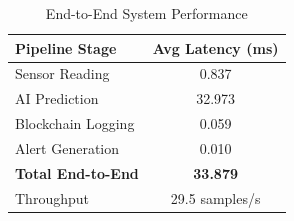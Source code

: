 \begin{table}[h]
\centering
\caption{End-to-End System Performance}
\begin{tabular}{lc}
\hline
Pipeline Stage & Avg Latency (ms) \\
\hline
Sensor Reading & 0.837 \\
AI Prediction & 32.973 \\
Blockchain Logging & 0.059 \\
Alert Generation & 0.010 \\
\hline
\textbf{Total End-to-End} & \textbf{33.879} \\
Throughput & 29.5 samples/s \\
\hline
\end{tabular}
\label{tab:integration}
\end{table}
